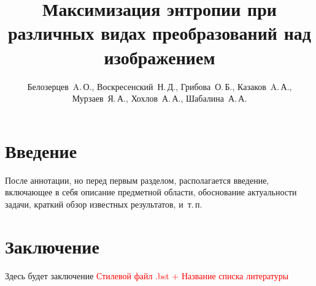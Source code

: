 \documentclass[12pt,twoside]{article}
\title
    [Максимизация энтропии при различных видах преобразований над изображением] %
    {Максимизация энтропии при различных видах преобразований над изображением}
\author
    [Автор~И.\,О.] %
    {Белозерцев~A.\,О., Воскресенский~Н.\,Д., Грибова~О.\,Б., Казаков~A.\,А., Мурзаев~Я.\,А., Хохлов~А.\,А., Шабалина~А.\,А.} %
    [Белозерцев~A.\,О.$^1$, Воскресенский~Н.\,Д.$^1$, Грибова~О.\,Б.$^1$, Казаков~A.\,А.$^1$, Мурзаев~Я.\,А.$^1$, Хохлов~А.\,А.$^1$, Шабалина~А.\,А.$^1$] %
\begin{document}
\maketitle
\section{Введение}
\nocite{*}
После аннотации, но перед первым разделом,
располагается введение, включающее в себя
описание предметной области,
обоснование актуальности задачи,
краткий обзор известных результатов,
и~т.\,п.

\section{Заключение}
Здесь будет заключение
\newpage
\textcolor{red}{Стилевой файл .bst + Название списка литературы}
\printbibliography


\end{document}

